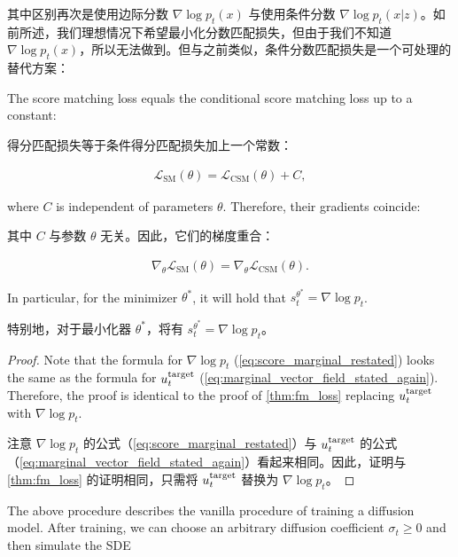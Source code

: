 其中区别再次是使用边际分数 $\nabla\log p_t(x)$ 与使用条件分数 $\nabla\log p_t(x|z)$。如前所述，我们理想情况下希望最小化分数匹配损失，但由于我们不知道 $\nabla\log p_t(x)$，所以无法做到。但与之前类似，条件分数匹配损失是一个可处理的替代方案：
\begin{theorem}
\label{thm:dsm_loss}
The score matching loss equals the conditional score matching loss up to a constant:

得分匹配损失等于条件得分匹配损失加上一个常数：

\begin{align*}
\mathcal{L}_{\text{SM}}(\theta) = \mathcal{L}_{\text{CSM}}(\theta) + C,
\end{align*}

where $C$ is independent of parameters $\theta$. Therefore, their gradients coincide:

其中 $C$ 与参数 $\theta$ 无关。因此，它们的梯度重合：

\begin{align*}
\nabla_\theta \mathcal{L}_{\text{SM}}(\theta) = \nabla_\theta \mathcal{L}_{\text{CSM}}(\theta).
\end{align*}

In particular, for the minimizer $\theta^*$, it will hold that $s_t^{\theta^*}=\nabla\log p_t$. 

特别地，对于最小化器 $\theta^*$，将有 $s_t^{\theta^*}=\nabla\log p_t$。
\end{theorem}
\begin{proof}
Note that the formula for $\nabla\log p_t$ (\cref{eq:score_marginal_restated}) looks the same as the formula for $u^{\text{target}}_t$ (\cref{eq:marginal_vector_field_stated_again}). Therefore, the proof is identical to the proof of \cref{thm:fm_loss} replacing $u^{\text{target}}_t$ with $\nabla\log p_t$.

注意 $\nabla\log p_t$ 的公式（\cref{eq:score_marginal_restated}）与 $u^{\text{target}}_t$ 的公式（\cref{eq:marginal_vector_field_stated_again}）看起来相同。因此，证明与 \cref{thm:fm_loss} 的证明相同，只需将 $u^{\text{target}}_t$ 替换为 $\nabla\log p_t$。
\end{proof}

The above procedure describes the vanilla procedure of training a diffusion model. After training, we can choose an arbitrary diffusion coefficient $\sigma_t\geq 0$ and then simulate the SDE

